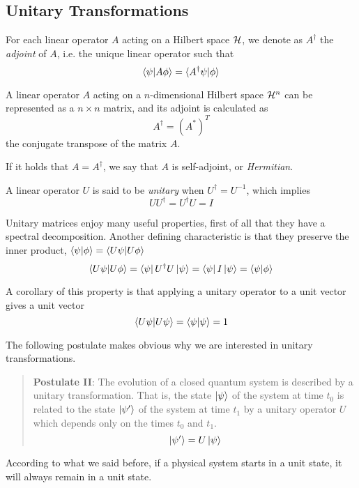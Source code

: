 \subsection{Unitary Transformations}

For each linear operator $A$ acting on a Hilbert space $\mathcal{H}$, we denote as $A^\dagger$ the \textit{adjoint} of $A$, i.e. the unique linear operator such that
\[
	\braket{\psi|A\phi} = \braket{A^\dagger\psi|\phi}
\]

A linear operator $A$ acting on a $n$-dimensional Hilbert space $\mathcal{H}^n$ can be represented as a $n\times n$ matrix, and its adjoint is calculated as 
\[
	A^\dagger = (A^*)^T
\] the conjugate transpose of the matrix $A$.


If it holds that $A = A^\dagger$, we say that $A$ is self-adjoint, or \textit{Hermitian}.

A linear operator $U$ is said to be \textit{unitary} when $U^\dagger = U^{-1}$, which implies 
\[
	UU^\dagger = U^\dagger U = I
\]

Unitary matrices enjoy many useful properties, first of all that they have a spectral decomposition. Another defining characteristic is that they preserve the inner product, $\braket{\psi | \phi} = \braket{U\psi | U\phi}$
\[
	\braket{U\psi | U\phi} = \bra{\psi}U^\dagger U\ket{\psi} = \bra{\psi}I\ket{\psi} = \braket{\psi|\phi}
\]

A corollary of this property is that applying a unitary operator to a unit vector gives a unit vector
\[
	\braket{U\psi | U\psi} = \braket{\psi|\psi} = 1
\]

The following postulate makes obvious why we are interested in unitary transformations.
\begin{quote}
\textbf{Postulate II}: The evolution of a closed quantum system is described by a unitary transformation. That is, the state $\ket{\psi}$ of the system at time $t_0$ is related to the state $\ket{\psi^\prime}$ of the system at time $t_1$ by a unitary operator $U$ which depends only on the times $t_0$ and $t_1$.
\[
	\ket{\psi^\prime} = U\ket{\psi}
\]
\end{quote}

According to what we said before, if a physical system starts in a unit state, it will always remain in a unit state.

